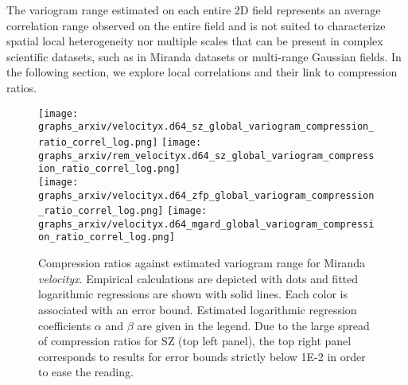 \documentclass[conference]{IEEEtran}
\begin{document}
The variogram range estimated on each entire 2D field represents an average correlation range observed on the entire field and is not suited to characterize spatial local  heterogeneity nor multiple scales that can be present in complex scientific datasets, such as in Miranda datasets or multi-range Gaussian fields. 
In the following section, we explore local correlations and  their link to compression ratios. 

\begin{figure}
\centering
{\texttt{[image: graphs\_arxiv/velocityx.d64\_sz\_global\_variogram\_compression\_ratio\_correl\_log.png]}} \hspace{-10pt} 
 \texttt{[image: graphs\_arxiv/rem\_velocityx.d64\_sz\_global\_variogram\_compression\_ratio\_correl\_log.png]}  \\
{\texttt{[image: graphs\_arxiv/velocityx.d64\_zfp\_global\_variogram\_compression\_ratio\_correl\_log.png]}} \hspace{-10pt} 
{\texttt{[image: graphs\_arxiv/velocityx.d64\_mgard\_global\_variogram\_compression\_ratio\_correl\_log.png]}} 
\vspace{-10pt}
\caption{Compression ratios against estimated variogram range for Miranda \textit{velocityx}. Empirical calculations are depicted with  dots and fitted logarithmic regressions are shown with solid lines. 
Each color is associated with  an error bound. 
Estimated logarithmic regression coefficients $\alpha$ and $\beta$ are given in the legend. 
Due to the large spread of compression ratios for SZ (top left panel), the top right panel corresponds to results for error bounds strictly below 1E-2 in order to ease the reading.}
\label{results_velocityx}
\vspace{-10pt}
\end{figure}
%
\end{document}
